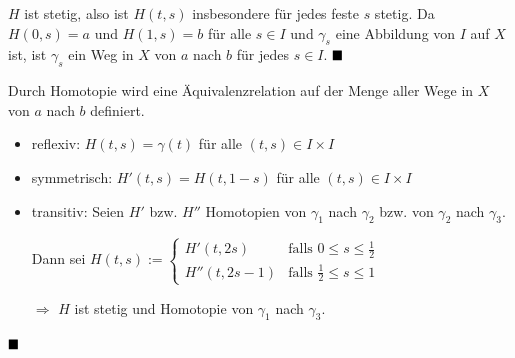 \begin{beweis}
    $H$ ist stetig, also ist $H(t, s)$ insbesondere für jedes feste
    $s$ stetig. Da $H(0,s) = a$ und $H(1,s) = b$ für alle $s \in I$
    und $\gamma_s$ eine Abbildung von $I$ auf $X$ ist,
    ist $\gamma_s$ ein Weg in $X$ von $a$ nach $b$ für jedes $s \in I$. $\qed$
\end{beweis}

\begin{bemerkung}
    Durch Homotopie wird eine Äquivalenzrelation auf der Menge aller
    Wege in $X$ von $a$ nach $b$ definiert.
\end{bemerkung}

\begin{beweis}\leavevmode
    \begin{itemize}
        \item reflexiv: $H(t,s) = \gamma(t)$ für alle $(t,s) \in I \times I$
        \item symmetrisch: $H'(t,s) = H(t,1-s)$ für alle $(t,s) \in I \times I$
        \item transitiv: Seien $H'$ bzw. $H''$ Homotopien von $\gamma_1$
              nach $\gamma_2$ bzw. von $\gamma_2$ nach $\gamma_3$.

              Dann sei $H(t,s) := \begin{cases}
              H'(t, 2s)    &\text{falls } 0 \leq s \leq \frac{1}{2}\\
              H''(t, 2s-1) &\text{falls } \frac{1}{2} \leq s \leq 1\end{cases}$

              $\Rightarrow$ $H$ ist stetig und Homotopie von $\gamma_1$ nach 
              $\gamma_3$.
    \end{itemize}
    $\qed$
\end{beweis}

